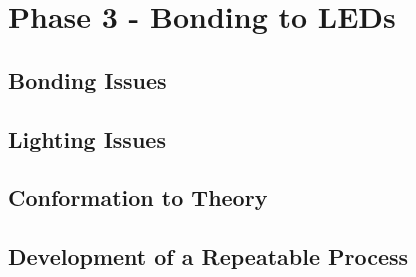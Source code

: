 \chapter{Phase 3 - Bonding to LEDs}
\label{sec:BondingToLEDS}
\section{Bonding Issues}
\section{Lighting Issues}
\section{Conformation to Theory}
\section{Development of a Repeatable Process}
